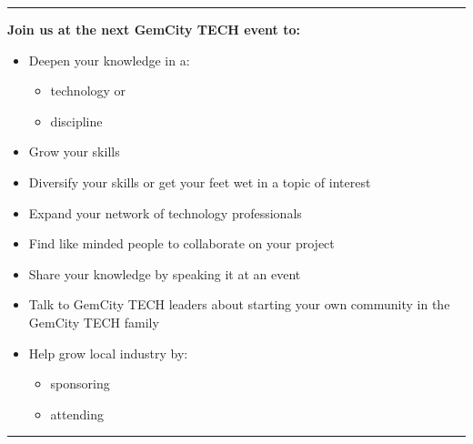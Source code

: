 \documentclass[14pt]{extarticle}
\author{}
\date{}
\providecommand{\tightlist}{%
  \setlength{\itemsep}{0pt}\setlength{\parskip}{0pt}}
\providecommand{\tightlist}{%
  \setlength{\itemsep}{0pt}\setlength{\parskip}{0pt}}
\begin{document}
\pagecolor{gemgreen}
\begin{multicols}{3}


\ifdefined\Shaded\renewenvironment{Shaded}{\begin{tcolorbox}[interior hidden, frame hidden, boxrule=0pt, enhanced, sharp corners, breakable, borderline west={3pt}{0pt}{shadecolor}]}{\end{tcolorbox}}\fi

\thispagestyle{empty}
\hrule

\textbf{Join us at the next GemCity TECH event to:}

\begin{itemize}
\tightlist
\item
  Deepen your knowledge in a:

  \begin{itemize}
  \tightlist
  \item
    technology or
  \item
    discipline
  \end{itemize}
\item
  Grow your skills
\item
  Diversify your skills or get your feet wet in a topic of interest
\item
  Expand your network of technology professionals
\item
  Find like minded people to collaborate on your project
\item
  Share your knowledge by speaking it at an event
\item
  Talk to GemCity TECH leaders about starting your own community in the
  GemCity TECH family
\item
  Help grow local industry by:

  \begin{itemize}
  \tightlist
  \item
    sponsoring
  \item
    attending
  \end{itemize}
\end{itemize}

\hrule



\end{multicols}
\end{document}
